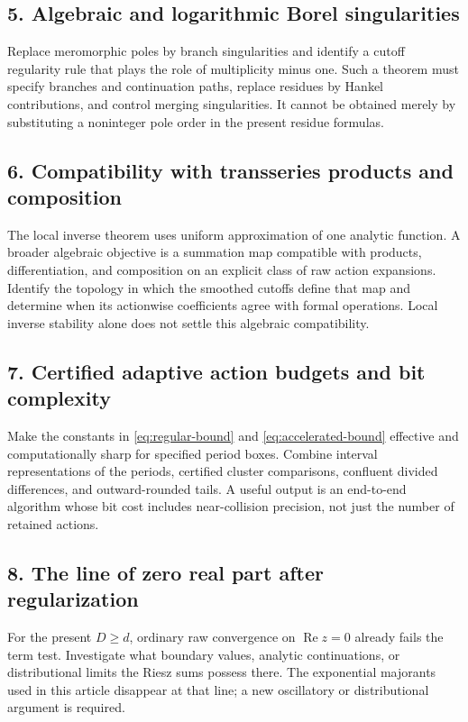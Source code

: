 \documentclass[11pt,a4paper]{article}
\numberwithin{equation}{section}
\theoremstyle{definition}
\theoremstyle{remark}
\newcommand{\re}{\operatorname{Re}}
\begin{document}
\subsection*{5. Algebraic and logarithmic Borel singularities}
Replace meromorphic poles by branch singularities and identify a cutoff
regularity rule that plays the role of multiplicity minus one. Such a
theorem must specify branches and continuation paths, replace residues
by Hankel contributions, and control merging singularities. It cannot
be obtained merely by substituting a noninteger pole order in the
present residue formulas.

\subsection*{6. Compatibility with transseries products and composition}
The local inverse theorem uses uniform approximation of one analytic
function. A broader algebraic objective is a summation map compatible
with products, differentiation, and composition on an explicit class
of raw action expansions. Identify the topology in which the smoothed
cutoffs define that map and determine when its actionwise coefficients
agree with formal operations. Local inverse stability alone does not
settle this algebraic compatibility.

\subsection*{7. Certified adaptive action budgets and bit complexity}
Make the constants in \eqref{eq:regular-bound} and
\eqref{eq:accelerated-bound} effective and computationally sharp for
specified period boxes. Combine interval representations of the periods,
certified cluster comparisons, confluent divided differences, and
outward-rounded tails. A useful output is an end-to-end algorithm whose
bit cost includes near-collision precision, not just the number of
retained actions.

\subsection*{8. The line of zero real part after regularization}
For the present $D\ge d$, ordinary raw convergence on $\re z=0$
already fails the term test. Investigate what boundary values, analytic
continuations, or distributional limits the Riesz sums possess there.
The exponential majorants used in this article disappear at that line;
a new oscillatory or distributional argument is required.
\end{document}
